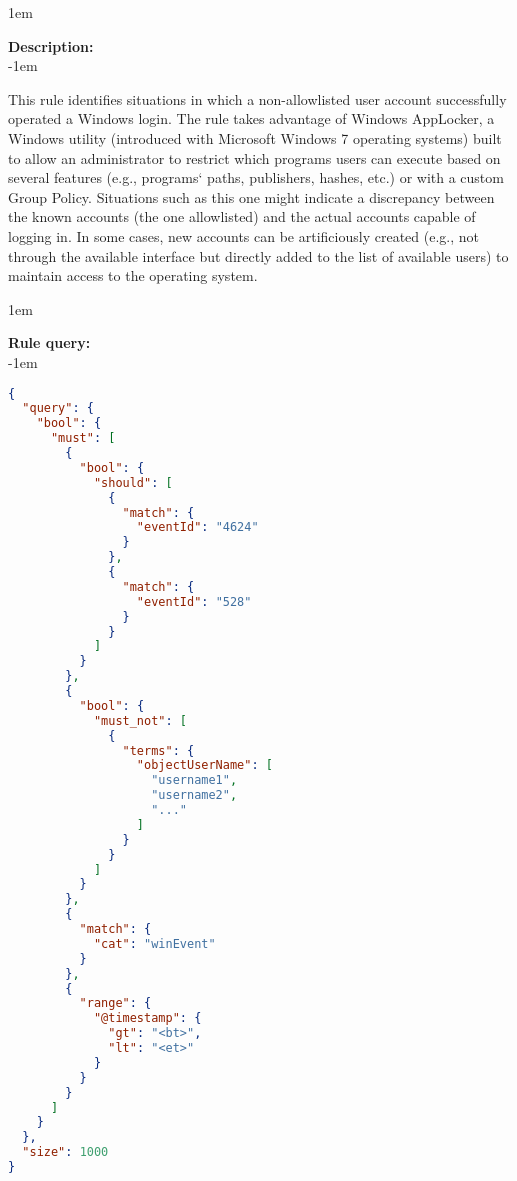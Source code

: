\openup 1em

{\bf Description:} \\

\openup -1em
\vspace{-2em}


This rule identifies situations in which a non-allowlisted user account successfully operated a Windows login. The rule takes advantage of Windows AppLocker, a Windows utility (introduced with Microsoft Windows 7 operating systems)  built to allow an administrator to restrict which programs users can execute based on several features (e.g., programs` paths, publishers, hashes, etc.) or with a custom Group Policy. Situations such as this one might indicate a discrepancy between the known accounts (the one allowlisted) and the actual accounts capable of logging in. In some cases, new accounts can be artificiously created (e.g., not through the available interface but directly added to the list of available users) to maintain access to the operating system.

\openup 1em

{\bf Rule query:} \\

\openup -1em
\vspace{-2em}

\begin{lstlisting}[language=json,firstnumber=1]
{
  "query": {
    "bool": {
      "must": [
        {
          "bool": {
            "should": [
              {
                "match": {
                  "eventId": "4624"
                }
              },
              {
                "match": {
                  "eventId": "528"
                }
              }
            ]
          }
        },
        {
          "bool": {
            "must_not": [
              {
                "terms": {
                  "objectUserName": [
                    "username1",
                    "username2",
                    "..."
                  ]
                }
              }
            ]
          }
        },
        {
          "match": {
            "cat": "winEvent"
          }
        },
        {
          "range": {
            "@timestamp": {
              "gt": "<bt>",
              "lt": "<et>"
            }
          }
        }
      ]
    }
  },
  "size": 1000
}
\end{lstlisting}

